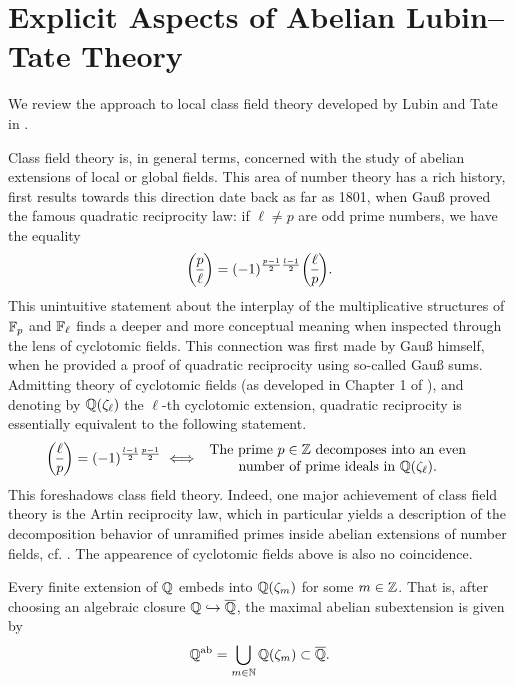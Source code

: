 \documentclass[../main.tex]{subfiles}
\begin{document}
\section{Explicit Aspects of Abelian Lubin--Tate Theory} %
\label{sec:Local Class Field Theory}
We review the approach to local class field theory developed by Lubin and Tate in \cite{LubinTateFormalMult}. 

Class field theory is, in general terms, concerned with the study of 
abelian extensions of local or global fields. This area of number theory 
has a rich history, first results towards this direction date back as far as
1801, when Gauß proved the famous quadratic reciprocity law: if $\ell \neq p$
are odd prime numbers, we have the equality
\begin{equation*}
  \legendre p \ell = (-1)^{\frac{p-1}2 \frac{l-1}2} \legendre \ell p.
\end{equation*}
This unintuitive statement about the interplay of the multiplicative structures of
$\mathbb{F}_p$ and $\mathbb{F}_\ell$ finds a deeper and more conceptual meaning when inspected through
the lens of cyclotomic fields. This connection
was first made by Gauß himself, when he provided a proof of quadratic
reciprocity using so-called Gauß sums. Admitting theory of cyclotomic fields 
(as developed in Chapter 1 of \cite{neukirch2006algebraische}), and denoting by
$\mathbb{Q}(\zeta_\ell)$ the $\ell$-th cyclotomic extension,
quadratic reciprocity is essentially equivalent to the following statement.
\begin{equation*}
  \legendre \ell p = (-1)^{\frac{l-1}2 \frac{p-1}2} \iff \begin{array}c
    \text{The prime $p \in \Z$
    decomposes into an even} \\ \text{number of prime ideals in
  $\Q(\zeta_\ell)$.} \end{array}
\end{equation*}
This foreshadows class field theory. Indeed, one major achievement
of class field theory is the Artin reciprocity law, which in particular yields a 
description of the decomposition behavior of unramified primes inside abelian extensions
of number fields, cf. \cite[Theorem 7.3]{neukirch2006algebraische}. 
The appearence of cyclotomic fields above is also no coincidence.

\begin{thm} \label{thm:KroneckerWeber}
  Every finite extension of $\mathbb{Q}$ embeds into $\mathbb{Q}(\zeta_m)$ for some $m \in \mathbb{Z}$.
  That is, after choosing an algebraic closure $\mathbb{Q} \hookrightarrow \overline {\mathbb{Q}}$, the maximal abelian
  subextension is given by 
  \begin{equation*}
    \mathbb{Q}^{\mathrm{ab}} = \bigcup_{m \in \mathbb{N}} \mathbb{Q}(\zeta_m) \subset \overline {\mathbb{Q}}.
  \end{equation*}
\end{thm}
\end{document}
